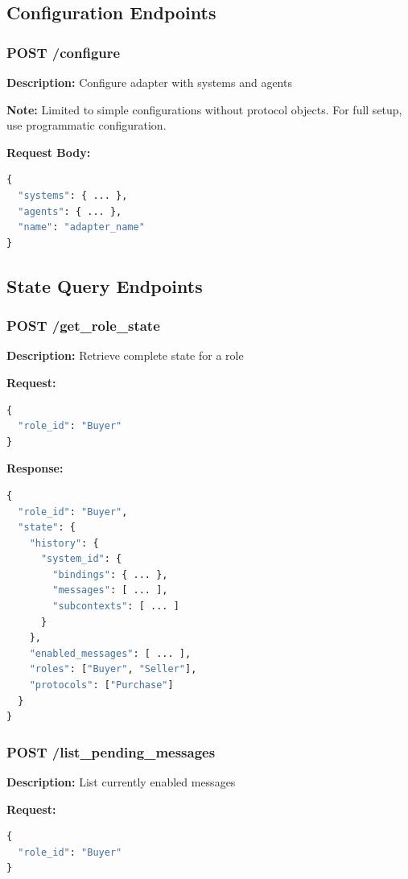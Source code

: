 \documentclass[11pt,a4paper]{article}
\begin{document}
\subsection{Configuration Endpoints}

\subsubsection{POST /configure}
\textbf{Description:} Configure adapter with systems and agents

\textbf{Note:} Limited to simple configurations without protocol objects. For full setup, use programmatic configuration.

\textbf{Request Body:}
\begin{lstlisting}[language=python]
{
  "systems": { ... },
  "agents": { ... },
  "name": "adapter_name"
}
\end{lstlisting}

\subsection{State Query Endpoints}

\subsubsection{POST /get\_role\_state}
\textbf{Description:} Retrieve complete state for a role

\textbf{Request:}
\begin{lstlisting}[language=python]
{
  "role_id": "Buyer"
}
\end{lstlisting}

\textbf{Response:}
\begin{lstlisting}[language=python]
{
  "role_id": "Buyer",
  "state": {
    "history": {
      "system_id": {
        "bindings": { ... },
        "messages": [ ... ],
        "subcontexts": [ ... ]
      }
    },
    "enabled_messages": [ ... ],
    "roles": ["Buyer", "Seller"],
    "protocols": ["Purchase"]
  }
}
\end{lstlisting}

\subsubsection{POST /list\_pending\_messages}
\textbf{Description:} List currently enabled messages

\textbf{Request:}
\begin{lstlisting}[language=python]
{
  "role_id": "Buyer"
}
\end{lstlisting}
\end{document}
